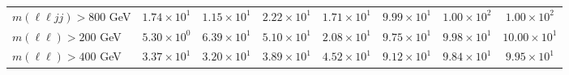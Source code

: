\begin{table}[htp]
{\begin{tabular}{l | c c c c | c c c}
      $m(\ell\ell jj) > 800$ GeV & $1.74 \times 10^{1}$ & $1.15 \times 10^{1}$ & $2.22 \times 10^{1}$ & $1.71 \times 10^{1}$ & $9.99 \times 10^{1}$ & $1.00 \times 10^{2}$ & $1.00 \times 10^{2}$ \\
      $m(\ell\ell) > 200$ GeV & $5.30 \times 10^{0}$ & $6.39 \times 10^{1}$ & $5.10 \times 10^{1}$ & $2.08 \times 10^{1}$ & $9.75 \times 10^{1}$ & $9.98 \times 10^{1}$ & $10.00 \times 10^{1}$ \\
      $m(\ell\ell) > 400$ GeV & $3.37 \times 10^{1}$ & $3.20 \times 10^{1}$ & $3.89 \times 10^{1}$ & $4.52 \times 10^{1}$ & $9.12 \times 10^{1}$ & $9.84 \times 10^{1}$ & $9.95 \times 10^{1}$ \\
      \hline
    \end{tabular}
  }
\end{table}
